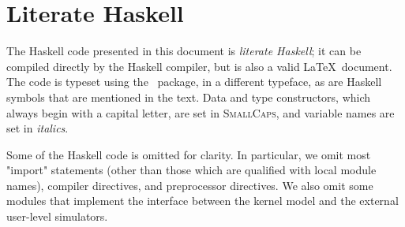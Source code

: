 \section{Literate Haskell}

The Haskell code presented in this document is \emph{literate Haskell}; it can be compiled directly by the Haskell compiler, but is also a valid \LaTeX\ document. The code is typeset using the \lambdaTeX\ package, in a {\hsfamily different typeface}, as are Haskell symbols that are mentioned in the text. Data and type constructors, which always begin with a capital letter, are set in {\hsfamily\scshape SmallCaps}, and variable names are set in {\hsfamily\itshape italics}.

Some of the Haskell code is omitted for clarity. In particular, we omit most "import" statements (other than those which are qualified with local module names), compiler directives, and preprocessor directives. We also omit some modules that implement the interface between the kernel model and the external user-level simulators.

